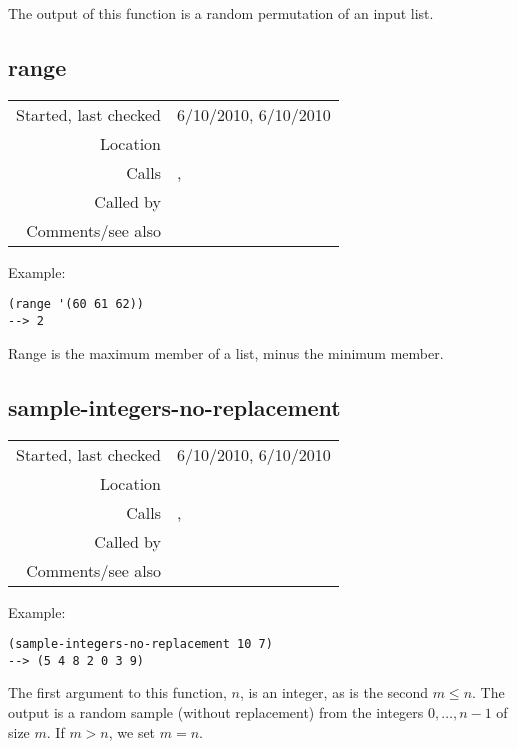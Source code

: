 \noindent The output of this function is a random
permutation of an input list.


\subsection*{range}\label{fun:range}

\vspace{0.3cm}
\begin{tabular}{r|p{8cm}}
Started, last checked & 6/10/2010, 6/10/2010 \\
Location & \nameref{sec:stats-sampling} \\
Calls & \nameref{fun:max-item}, \nameref{fun:min-item} \\
Called by & \nameref{fun:pitch-range} \\
Comments/see also & 
\end{tabular}

\vspace{0.5cm}
\noindent Example:
\begin{verbatim}
(range '(60 61 62))
--> 2

\end{verbatim}

\noindent Range is the maximum member of a list, minus
the minimum member.


\subsection*{sample-integers-no-replacement}\label{fun:sample-integers-no-replacement}

\vspace{0.3cm}
\begin{tabular}{r|p{8cm}}
Started, last checked & 6/10/2010, 6/10/2010 \\
Location & \nameref{sec:stats-sampling} \\
Calls & \nameref{fun:add-to-list}, \nameref{fun:choose-one} \nameref{fun:first-n-naturals} \\
Called by & \nameref{fun:random-permutation} \\
Comments/see also & 
\end{tabular}

\vspace{0.5cm}
\noindent Example:
\begin{verbatim}
(sample-integers-no-replacement 10 7)
--> (5 4 8 2 0 3 9)
\end{verbatim}

\noindent The first argument to this function, $n$, is
an integer, as is the second $m \leq n$. The output is
a random sample (without replacement) from the
integers $0,\ldots, n-1$ of size $m$. If $m > n$, we
set $m = n$.


